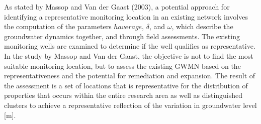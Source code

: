 As stated by Massop and Van der Gaast (2003), a potential approach for identifying a representative monitoring location in an existing network involves the computation of the parameters  \(haverage\), \(\delta\), and \(\omega\), which describe the groundwater dynamics together, and through field assessments. The existing monitoring wells are examined to determine if the well qualifies as representative. In the study by Massop and Van der Gaast, the objective is not to find the most suitable monitoring location, but to assess the existing GWMN based on the representativeness and the potential for remediation and expansion. The result of the assessment is a set of locations that is representative for the distribution of properties that occurs within the entire research area as well as distinguished clusters to achieve a representative reflection of the variation in groundwater level [m].

